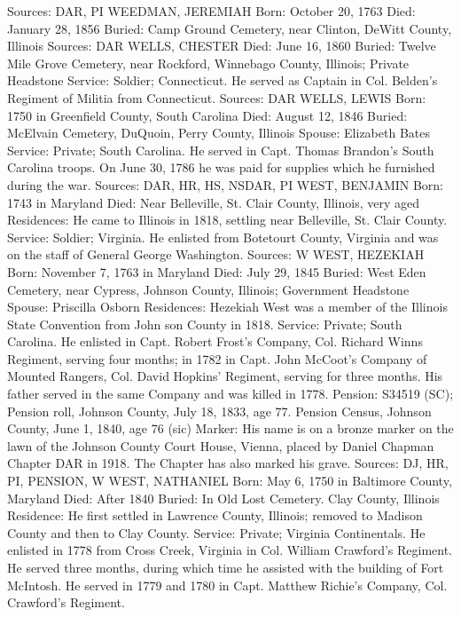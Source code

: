 Sources: DAR, PI 
WEEDMAN, JEREMIAH 
Born: October 20, 1763 
Died: January 28, 1856 
Buried: Camp Ground Cemetery, near Clinton, DeWitt County, Illinois 
Sources: DAR 
WELLS, CHESTER
Died: June 16, 1860 
Buried: Twelve Mile Grove Cemetery, near Rockford, Winnebago County, Illinois; Private Headstone
Service: Soldier; Connecticut. He served as Captain in Col. Belden's Regiment of Militia from Connecticut. 
Sources: DAR 
WELLS, LEWIS 
Born: 1750 in Greenfield County, South Carolina
Died: August 12, 1846 
Buried: McElvain Cemetery, DuQuoin, Perry County, Illinois 
Spouse: Elizabeth Bates 
Service: Private; South Carolina. He served in Capt. Thomas Brandon's South Carolina troops. On June 30, 1786 he was paid for supplies which he fur­nished during the war. 
Sources: DAR, HR, HS, NSDAR, PI 
WEST, BENJAMIN 
Born: 1743 in Maryland 
Died: Near Belleville, St. Clair County, Illinois, very aged 
Residences: He came to Illinois in 1818, settling near Belleville, St. Clair County. 
Service: Soldier; Virginia. He enlisted from Botetourt County, Virginia and was on the staff of General George Washington. 
Sources: W 
WEST, HEZEKIAH 
Born: November 7, 1763 in Maryland
Died: July 29, 1845 
Buried: West Eden Cemetery, near Cypress, Johnson County, Illinois; Govern­ment Headstone 
Spouse: Priscilla Osborn 
Residences: Hezekiah West was a member of the Illinois State Convention from John son County in 1818. 
Service: Private; South Carolina. He enlisted in Capt. Robert Frost's Company, Col. Richard Winns Regiment, serving four months; in 1782 in Capt. John McCoot's Company of Mounted Rangers, Col. David Hopkins' Regiment, serving for three months. His father served in the same Company and was killed in 1778. 
Pension: S34519 (SC); Pension roll, Johnson County, July 18, 1833, age 77. Pen­sion Census, Johnson County, June 1, 1840, age 76 (sic) 
Marker: His name is on a bronze marker on the lawn of the Johnson County Court House, Vienna, placed by Daniel Chapman Chapter DAR in 1918. The Chapter has also marked his grave. 
Sources: DJ\R, HR, PI, PENSION, W 
WEST, NATHANIEL 
Born:  May 6, 1750 in Baltimore County, Maryland 
Died: After 1840 
Buried: In Old Lost Cemetery. Clay County, Illinois 
Residence: He first settled in Lawrence County, Illinois; removed to Madison County and then to Clay County.
Service: Private; Virginia Continentals. He enlisted in 1778 from Cross Creek, Virginia in Col. William Crawford's Regiment. He served three months, during which time he assisted with the building of Fort McIntosh. He served in 1779 and 1780 in Capt. Matthew Richie's Company, Col. Crawford's Regiment. 
